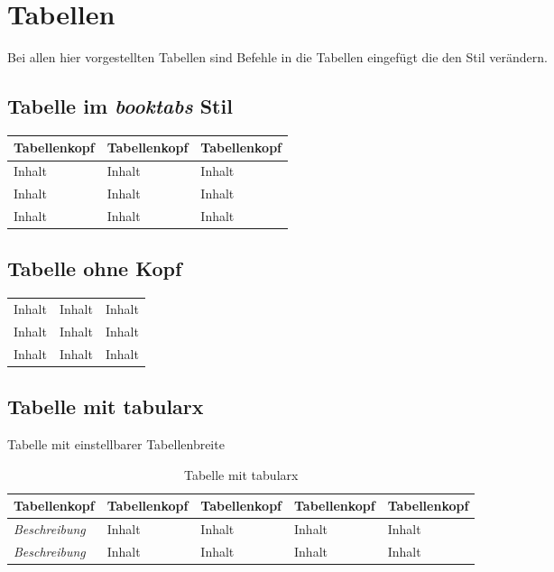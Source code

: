 \section{Tabellen}

Bei allen hier vorgestellten Tabellen sind Befehle in die Tabellen eingefügt 
die den Stil verändern.

%
\subsection{Tabelle im \emph{booktabs} Stil}
%
\begin{table}[H]
\tablestyle
\begin{tabular}{lll}
\toprule
   Tabellenkopf &
   Tabellenkopf &
   Tabellenkopf \tabularnewline
\midrule
Inhalt & Inhalt  & Inhalt \tabularnewline
Inhalt & Inhalt  & Inhalt \tabularnewline
Inhalt & Inhalt  & Inhalt \tabularnewline
\bottomrule
\end{tabular}
\end{table}
%


\subsection{Tabelle ohne Kopf}

\begin{table}[H]
\tablestyle
\begin{tabular}{lll}
\hline
Inhalt & Inhalt  & Inhalt \tabularnewline
Inhalt & Inhalt  & Inhalt \tabularnewline
Inhalt & Inhalt  & Inhalt \tabularnewline
\hline
\end{tabular}
\end{table}

%
\subsection{Tabelle mit tabularx}
Tabelle mit einstellbarer Tabellenbreite
\begin{table}[H]
\tablestyle
\begin{tabularx}{\textwidth}{lXXlX}
\toprule
   Tabellenkopf &
   Tabellenkopf &
   Tabellenkopf &
   Tabellenkopf &
   Tabellenkopf \tabularnewline
\midrule
%
   \textit{Beschreibung} & Inhalt & Inhalt & Inhalt & Inhalt \tabularnewline
   \textit{Beschreibung} & Inhalt & Inhalt & Inhalt & Inhalt \tabularnewline
\bottomrule
\end{tabularx}
\caption{Tabelle mit tabularx}
\end{table}
%

